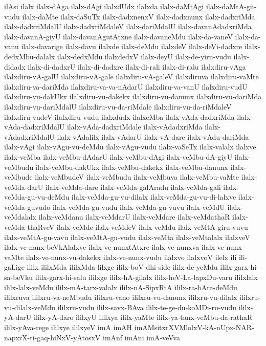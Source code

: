 {ilAsi
ilalx
ilalx-dAga
ilalx-dAgi
ilalxdUdx
ilalxda
ilalx-daMtAgi
ilalx-daMtA-gu-vudu
ilalx-daMte
ilalx-daSuTx
ilalx-dadxnenxV
ilalx-dadxnunx
ilalx-dadxriMda
ilalx-dadxriMdalU
ilalx-dadxriMdaleV
ilalx-dariMdalU
ilalx-davanAdadxriMda
ilalx-davanA-giyU
ilalx-davanAgutAtxne
ilalx-davaneMdu
ilalx-da-vaneV
ilalx-da-vanu
ilalx-davarige
ilalx-davu
ilalxde
ilalx-deMdu
ilalxdeV
ilalx-deVi-dadxre
ilalx-dedxMbu-dalalx
ilalx-dedxMdu
ilalxdedxV
ilalx-deyU
ilalx-de-yiru-vudu
ilalx-didadx
ilalx-di-dadxrU
ilalx-di-dadxre
ilalx-di-rali
ilalx-di-ralu
ilalxdiru-vAga
ilalxdiru-vA-galU
ilalxdiru-vA-gale
ilalxdiru-vA-galeV
ilalxdiruva
ilalxdiru-vaMte
ilalxdiru-va-dariMda
ilalxdiru-va-va-nAdarU
ilalxdiru-va-vanU
ilalxdiru-vudU
ilalxdiru-vu-dakUkx
ilalxdiru-vu-dakekx
ilalxdiru-vu-danunx
ilalxdiru-vu-dariMda
ilalxdiru-vu-dariMdalU
ilalxdiru-vu-da-riMdale
ilalxdiru-vu-da-riMdaleV
ilalxdiru-vudeV
ilalxdiru-vudu
ilalxdudx
ilalxeMba
ilalx-vAda-dadxriMda
ilalx-vAda-dadxriMdalU
ilalx-vAda-dadxriMdale
ilalx-vAdadxriMda
ilalx-vAdadxriMdalU
ilalx-vAdalilx
ilalx-vAdarU
ilalx-vA-dare
ilalx-vAdu-dariMda
ilalx-vAgi
ilalx-vAgu-vu-deMdu
ilalx-vAgu-vudu
ilalx-vaSeTx
ilalx-valalx
ilalxve
ilalx-veMba
ilalx-veMbu-dAdarU
ilalx-veMbu-dAgi
ilalx-veMbu-dA-giyU
ilalx-veMbudu
ilalx-veMbu-dakUkx
ilalx-veMbu-dakekx
ilalx-veMbu-danunx
ilalx-veMbude
ilalx-veMbudeV
ilalx-veMbudu
ilalx-veMbuva
ilalx-veMbu-vaMte
ilalx-veMda-darU
ilalx-veMda-dare
ilalx-veMda-galAradu
ilalx-veMda-gali
ilalx-veMda-gu-vu-deMdu
ilalx-veMda-gu-vu-dilalx
ilalx-veMda-gu-vu-di-lalxve
ilalx-veMda-guvudo
ilalx-veMda-gu-vudu
ilalx-veMda-gu-vuvu
ilalx-veMdU
ilalx-veMdalalx
ilalx-veMdanu
ilalx-veMdarU
ilalx-veMdare
ilalx-veMdathaR
ilalx-veMda-thaRveV
ilalx-veMde
ilalx-veMdeV
ilalx-veMdu
ilalx-veMtA-giru-vuvu
ilalx-veMtA-gu-vavu
ilalx-veMtA-gu-vudu
ilalx-veMta
ilalx-veMtalalx
ilalxveV
ilalx-ve-nanx-beVkAlalxve
ilalx-ve-nunxtAtxre
ilalx-ve-nunxva
ilalx-ve-nunx-vaMte
ilalx-ve-nunx-vu-dakekx
ilalx-ve-nunx-vudu
ilalxvo
ilalxvoV
ilelx
ili
ili-gaLige
ililx
ililxMda
ililxMda-lilxge
ililx-boV-dhi-side
ililx-de-yeMdu
ililx-garx-hi-sa-beVku
ililx-garx-hi-salu
ililxge
ililx-hA-gilalx
ililx-heV-La-lapxDu-varu
ililxlalx
ililx-lalx-veMdu
ililx-mA-tarx-valalx
ililx-nA-SipxRtA
ililx-ra-bAra-deMdu
ililxruva
ililxru-va-neMbudu
ililxru-vano
ililxru-vu-danunx
ililxru-vu-dilalx
ililxru-vu-dilalx-veMdu
ililxru-vudu
ililx-savx-BAva
ililx-te-ge-du-koMDi-ru-vudu
ililx-yA-darU
ililx-yA-daro
ililxyU
ililxya
ililx-yaMte
ililx-ya-tanx-veMbu-da-rathaR
ililx-yAva-rege
ililxye
ililxyeV
imA
imAH
imAMsitxrXVMlolxV-kA-nUpx-NAR-napxrX-ti-gaq-hiNxV-yAtosxV
imAnf
imAni
imA-veVva
}
